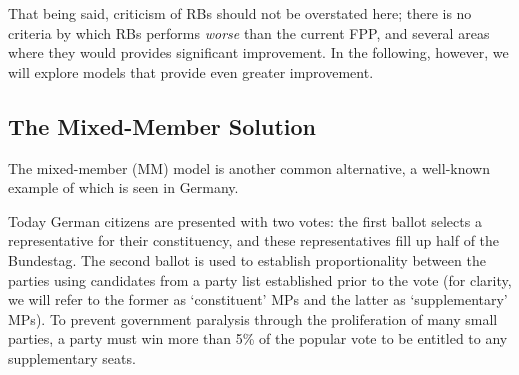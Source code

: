 \documentclass[DIV=calc, paper=a4, fontsize=11pt, twocolumn]{scrartcl}	 %
\begin{document}
That being said, criticism of RBs should not be overstated here; there is no criteria by which RBs performs \emph{worse} than the current FPP, and several areas where they would provides significant improvement. 
In the following, however, we will explore models that provide even greater improvement.


\subsection{The Mixed-Member Solution}
\label{sec:german_model}

The mixed-member (MM) model is another common alternative, a well-known example of which is seen in Germany.

Today German citizens are presented with two votes: the first ballot selects a representative for their constituency, and these representatives fill up half of the Bundestag. 
The second ballot is used to establish proportionality between the parties using candidates from a party list established prior to the vote
(for clarity, we will refer to the former as `constituent' MPs  and the latter as `supplementary' MPs).
To prevent government paralysis through the proliferation of many small parties, a party must win more than 5\% of the popular vote to be entitled to any supplementary seats.
\end{document}
